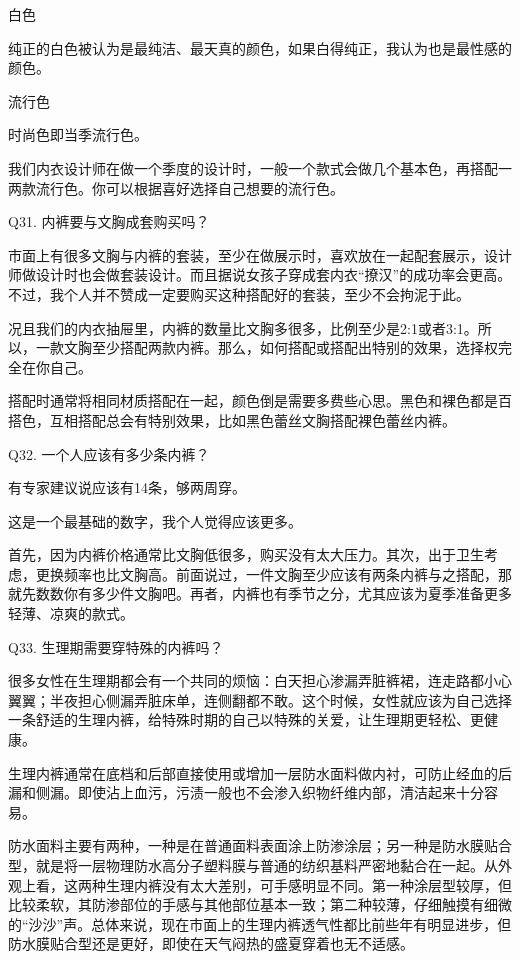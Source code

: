 \documentclass[12pt,UTF8]{ctexbook}
\begin{document}
白色

纯正的白色被认为是最纯洁、最天真的颜色，如果白得纯正，我认为也是最性感的颜色。

流行色

时尚色即当季流行色。

我们内衣设计师在做一个季度的设计时，一般一个款式会做几个基本色，再搭配一两款流行色。你可以根据喜好选择自己想要的流行色。





Q31. 内裤要与文胸成套购买吗？


市面上有很多文胸与内裤的套装，至少在做展示时，喜欢放在一起配套展示，设计师做设计时也会做套装设计。而且据说女孩子穿成套内衣“撩汉”的成功率会更高。不过，我个人并不赞成一定要购买这种搭配好的套装，至少不会拘泥于此。

况且我们的内衣抽屉里，内裤的数量比文胸多很多，比例至少是2:1或者3:1。所以，一款文胸至少搭配两款内裤。那么，如何搭配或搭配出特别的效果，选择权完全在你自己。


搭配时通常将相同材质搭配在一起，颜色倒是需要多费些心思。黑色和裸色都是百搭色，互相搭配总会有特别效果，比如黑色蕾丝文胸搭配裸色蕾丝内裤。





Q32. 一个人应该有多少条内裤？


有专家建议说应该有14条，够两周穿。

这是一个最基础的数字，我个人觉得应该更多。

首先，因为内裤价格通常比文胸低很多，购买没有太大压力。其次，出于卫生考虑，更换频率也比文胸高。前面说过，一件文胸至少应该有两条内裤与之搭配，那就先数数你有多少件文胸吧。再者，内裤也有季节之分，尤其应该为夏季准备更多轻薄、凉爽的款式。





Q33. 生理期需要穿特殊的内裤吗？


很多女性在生理期都会有一个共同的烦恼：白天担心渗漏弄脏裤裙，连走路都小心翼翼；半夜担心侧漏弄脏床单，连侧翻都不敢。这个时候，女性就应该为自己选择一条舒适的生理内裤，给特殊时期的自己以特殊的关爱，让生理期更轻松、更健康。

生理内裤通常在底档和后部直接使用或增加一层防水面料做内衬，可防止经血的后漏和侧漏。即使沾上血污，污渍一般也不会渗入织物纤维内部，清洁起来十分容易。

防水面料主要有两种，一种是在普通面料表面涂上防渗涂层；另一种是防水膜贴合型，就是将一层物理防水高分子塑料膜与普通的纺织基料严密地黏合在一起。从外观上看，这两种生理内裤没有太大差别，可手感明显不同。第一种涂层型较厚，但比较柔软，其防渗部位的手感与其他部位基本一致；第二种较薄，仔细触摸有细微的“沙沙”声。总体来说，现在市面上的生理内裤透气性都比前些年有明显进步，但防水膜贴合型还是更好，即使在天气闷热的盛夏穿着也无不适感。
\end{document}
